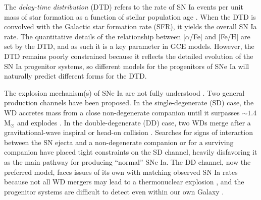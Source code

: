 \documentclass[twocolumn,twocolappendix,linenumbers]{aastex631}
\newcommand{\aFe}{[$\alpha$/Fe]\xspace}
\begin{document}
The {\it delay-time distribution} (DTD) refers to the rate of SN Ia events per unit mass of star formation as a function of stellar population age
\citep[for a review, see Section 3.5 of][]{Maoz2014-Review}.
When the DTD is convolved with the Galactic star formation rate (SFR), it yields the overall SN Ia rate. 
The quantitative details of the relationship between \aFe and [Fe/H] are set by the DTD, and as such it is a key parameter in GCE models.
However, the DTD remains poorly constrained because it reflects the detailed evolution of the SN Ia progenitor systems, so different models for the progenitors of SNe Ia will naturally predict different forms for the DTD.

The explosion mechanism(s) of SNe Ia are not fully understood \citep[for reviews, see][]{Maoz2014-Review,Livio2018-ProgenitorReview,Ruiter2020-ProgenitorReview}. Two general production channels have been proposed. In the single-degenerate (SD) case, the WD accretes mass from a close non-degenerate companion until it surpasses $\sim1.4$ M$_\odot$ and explodes \citep{Whelan1973-SDModel,Nomoto1982-SDModel,Yoon2003-SDModel}. In the double-degenerate (DD) case, two WDs merge after a gravitational-wave inspiral \citep{Iben1984-IaBinary,Webbink1984-DDModel,Pakmor2012-WDMerger} or head-on collision \citep{Benz1989-CollisionalDD,Thompson2011-CollisionalDD}. Searches for signs of interaction between the SN ejecta and a non-degenerate companion \citep[e.g.,][]{Panagia2006-RadioEmission,Chomiuk2016-RadioEmission,Fausnaugh2019-EarlyIaLightCurves,Tucker2020-SNeIaSpectra,Dubay2022-SNeIaCSM} or for a surviving companion \citep[e.g.,][]{Schaefer2012-ExCompanionSNR,Do2021-Progenitor1972E,Tucker2023-SN2011fe} have placed tight constraints on the SD channel, heavily disfavoring it as the main pathway for producing ``normal'' SNe Ia. The DD channel, now the preferred model, faces issues of its own with matching observed SN Ia rates because not all WD mergers may lead to a thermonuclear explosion \citep[e.g.,][]{NomotoIben1985-DDMergers,SaioNomoto1998-DDMergers,Shen2012-DDMergers}, and the progenitor systems are difficult to detect even within our own Galaxy \citep{RebassaMansergas2019-WhereAreDDProgenitors}.
\end{document}
